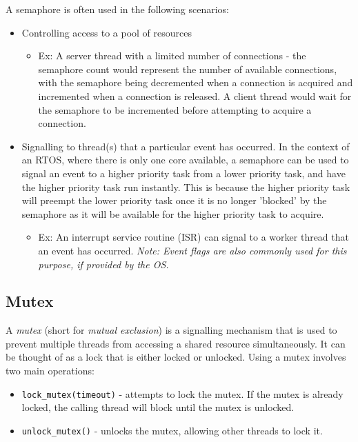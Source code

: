 \documentclass[main.tex]{subfiles}
\begin{document}
\noindent A semaphore is often used in the following scenarios:
\begin{itemize}
    \item Controlling access to a pool of resources 
    \begin{itemize}
        \item Ex: A server thread with a limited number of connections - the semaphore count would represent the number of available connections, with the semaphore being decremented when a connection is acquired and incremented when a connection is released. A client thread would wait for the semaphore to be incremented before attempting to acquire a connection.
    \end{itemize}
    \item Signalling to thread(s) that a particular event has occurred. In the context of an RTOS, where there is only one core available, a semaphore can be used to signal an event to a higher priority task from a lower priority task, and have the higher priority task run instantly. This is because the higher priority task will preempt the lower priority task once it is no longer 'blocked' by the semaphore as it will be available for the higher priority task to acquire.
    \begin {itemize}
        \item Ex: An interrupt service routine (ISR) can signal to a worker thread that an event has occurred. \textit{Note: Event flags are also commonly used for this purpose, if provided by the OS.}
    \end{itemize}
\end{itemize}

\subsection{Mutex}
A \textit{mutex} (short for \textit{mutual exclusion}) is a signalling mechanism that is used to prevent multiple threads from accessing a shared resource simultaneously. It can be thought of as a lock that is either locked or unlocked.
\newline
\newline
\noindent Using a mutex involves two main operations: \begin{itemize}
    \item \texttt{lock\_mutex(timeout)} - attempts to lock the mutex. If the mutex is already locked, the calling thread will block until the mutex is unlocked.
    \item \texttt{unlock\_mutex()} - unlocks the mutex, allowing other threads to lock it.
\end{itemize}
\end{document}
